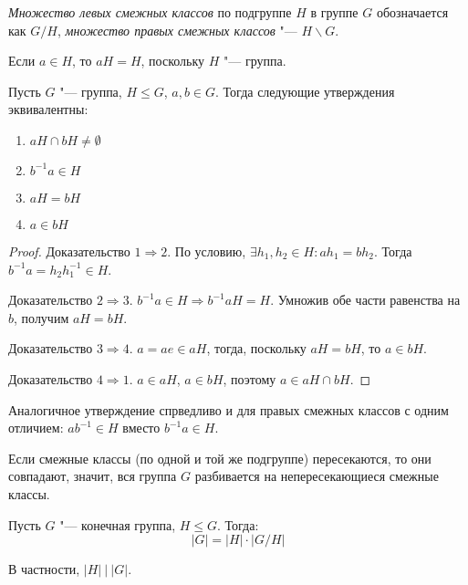 \begin{definition}
	\textit{Множество левых смежных классов} по подгруппе $H$ в группе $G$ обозначается как $G/H$, \textit{множество правых смежных классов} "--- $H\backslash G$.
\end{definition}

\begin{note}
	Если $a \in H$, то $aH = H$, поскольку $H$ "--- группа.
\end{note}

\begin{proposition}
	Пусть $G$ "--- группа, $H \le G$, $a, b \in G$. Тогда следующие утверждения эквивалентны:
	\begin{enumerate}
		\item $aH \cap bH \ne \emptyset$
		\item $b^{-1}a \in H$
		\item $aH = bH$
		\item $a \in bH$
	\end{enumerate}
\end{proposition}

\begin{proof}
	Доказательство $1 \Rightarrow 2$. По условию, $\exists h_1, h_2 \in H: ah_1 = bh_2$. Тогда $b^{-1}a = h_2h_1^{-1} \in H$.
	
	Доказательство $2 \Rightarrow 3$. $b^{-1}a \in H \Rightarrow b^{-1}aH = H$. Умножив обе части равенства на $b$, получим $aH = bH$.
	
	Доказательство $3 \Rightarrow 4$. $a = ae \in aH$, тогда, поскольку $aH = bH$, то $a \in bH$.
	
	Доказательство $4 \Rightarrow 1$. $a \in aH$, $a \in bH$, поэтому $a \in aH \cap bH$.
\end{proof}

\begin{note}
	Аналогичное утверждение спрведливо и для правых смежных классов с одним отличием: $ab^{-1} \in H$ вместо $b^{-1}a \in H$.
\end{note}

\begin{corollary}
	Если смежные классы (по одной и той же подгруппе) пересекаются, то они совпадают, значит, вся группа $G$ разбивается на непересекающиеся смежные классы.
\end{corollary}

\begin{theorem}[Лагранжа]
	Пусть $G$ "--- конечная группа, $H \le G$. Тогда:
	\[|G| = |H|\cdot|G/H|\]
	
	В частности, $|H|~\big|~|G|$.
\end{theorem}

